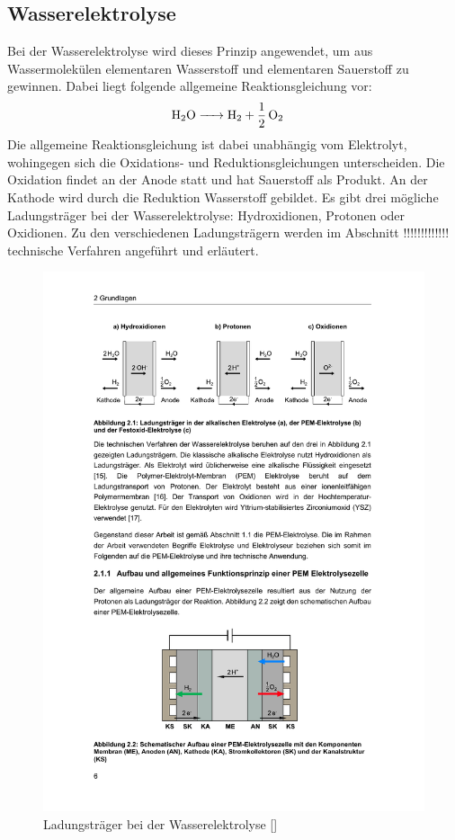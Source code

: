 \subsection{Wasserelektrolyse}
\label{subsec:Elektrolyse} 
Bei der Wasserelektrolyse wird dieses Prinzip angewendet, um aus Wassermolekülen elementaren Wasserstoff und elementaren Sauerstoff zu gewinnen. Dabei liegt folgende allgemeine Reaktionsgleichung vor:   
\begin{align}
	\ce{ H2O &-> H2 + 1/2O2}
\end{align}
Die allgemeine Reaktionsgleichung ist dabei unabhängig vom Elektrolyt, wohingegen sich die Oxidations- und Reduktionsgleichungen unterscheiden. Die Oxidation findet an der Anode statt und hat Sauerstoff als Produkt. An der Kathode wird durch die Reduktion Wasserstoff gebildet. Es gibt drei mögliche Ladungsträger bei der Wasserelektrolyse: Hydroxidionen, Protonen oder Oxidionen. Zu den verschiedenen Ladungsträgern werden im Abschnitt !!!!!!!!!!!!! technische Verfahren angeführt und erläutert.
\begin{figure}[h]
	\centering
		\includegraphics[scale=1]{Figures/LadungstraegerBeiDerWasserelektrolyse}
		\caption{Ladungsträger bei der 
		Wasserelektrolyse [\cite{ISBN 978-3-95806-217-7}]}
\label{fig:LadungstraegerBeiDerWasserelektrolyse}	
\end{figure}

